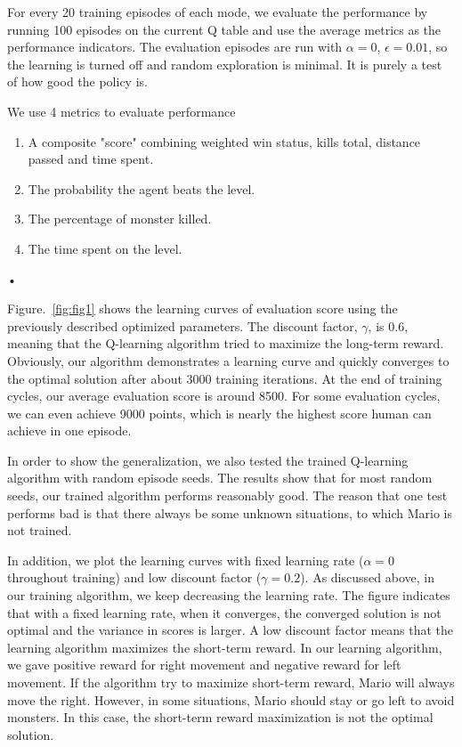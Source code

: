 For every 20 training episodes of each mode, we evaluate the performance by running 100 episodes on the current Q table and use the average metrics as the performance indicators. The evaluation episodes are run with $\alpha = 0$, $\epsilon = 0.01$, so the learning is turned off and random exploration is minimal. It is purely a test of how good the policy is.

We use 4 metrics to evaluate performance
\begin{enumerate}
\item
A composite "score" combining weighted win status, kills total, distance passed and time spent.
\item
The probability the agent beats the level.
\item
The percentage of monster killed.
\item
The time spent on the level.
\end{enumerate}•


Figure.~\ref{fig:fig1} shows the learning curves of evaluation score using the previously described optimized parameters. The discount factor, $\gamma$, is $0.6$, meaning that the Q-learning algorithm tried to maximize the long-term reward. Obviously, our algorithm demonstrates a learning curve and quickly converges to the optimal solution after about 3000 training iterations. At the end of training cycles, our average evaluation score is around 8500. For some evaluation cycles, we can even achieve  9000 points, which is nearly the highest score human can achieve in one episode.

In order to show the generalization, we also tested the trained Q-learning algorithm with random episode seeds. The results show that for most random seeds, our trained algorithm performs reasonably good. The reason that one test performs bad is that there always be some unknown situations, to which Mario is not trained. 

In addition, we plot the learning curves with fixed learning rate ($\alpha = 0$ throughout training) and low discount factor ($\gamma = 0.2$). As discussed above, in our training algorithm, we keep decreasing the learning rate. The figure indicates that with a fixed learning rate, when it converges, the converged solution is not optimal and the variance in scores is larger. A low discount factor means that the learning algorithm maximizes the short-term reward. In our learning algorithm, we gave positive reward for right movement and negative reward for left movement. If the algorithm try to maximize short-term reward, Mario will always move the right. However, in some situations, Mario should stay or go left to avoid monsters. In this case, the short-term reward maximization is not the optimal solution.
 
